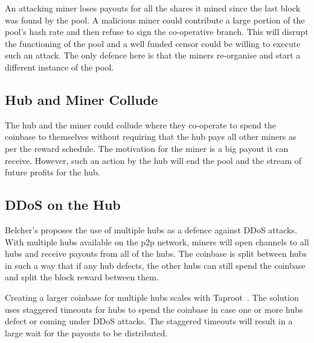 \documentclass{article}
\begin{document}

An attacking miner loses payouts for all the shares it mined since the
last block was found by the pool. A malicious miner could contribute a
large portion of the pool's hash rate and then refuse to sign the
co-operative branch. This will disrupt the functioning of the pool and
a well funded censor could be willing to execute such an attack. The
only defence here is that the miners re-organise and start a different
instance of the pool.

\subsection{Hub and Miner Collude}\label{ref:collusion}

The hub and the miner could collude where they co-operate to spend the
coinbase to themselves without requiring that the hub pays all other
miners as per the reward schedule. The motivation for the miner is a
big payout it can receive. However, such an action by the hub will
end the pool and the stream of future profits for the hub.


\subsection{DDoS on the Hub}\label{ref:ddos-attack}

Belcher's proposes the use of multiple hubs as a defence against DDoS
attacks. With multiple hubs available on the p2p network, miners will
open channels to all hubs and receive payouts from all of the
hubs. The coinbase is split between hubs in such a way that if any hub
defects, the other hubs can still spend the coinbase and split the
block reward between them.

Creating a larger coinbase for multiple hubs scales with
Taproot~\cite{bip340,bip341, bip342}. The solution uses staggered
timeouts for hubs to spend the coinbase in case one or more hubs
defect or coming under DDoS attacks. The staggered timeouts will
result in a large wait for the payouts to be distributed.
\end{document}
